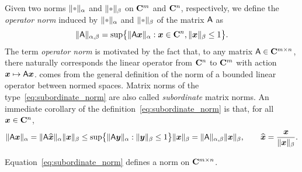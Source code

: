 Given two norms $\norm{\placeholder}_{\alpha}$ and $\norm{\placeholder}_{\beta}$ on $\mathbf C^m$ and $\mathbf C^n$, respectively,
we define the \emph{operator norm} induced by $\norm{\placeholder}_{\alpha}$ and $\norm{\placeholder}_{\beta}$ of the matrix $\mathsf A$ as
\begin{equation}
    \label{eq:subordinate_norm}
    \lVert\mathsf A\rVert_{\alpha,\beta} = \sup \bigl\{ \lVert\mathsf A \mathbf{\boldsymbol{x}}\rVert_{\alpha} : \mathbf{\boldsymbol{x}} \in \mathbf C^n, \lVert\mathbf{\boldsymbol{x}}\rVert_{\beta} \leq 1 \bigr\}.
\end{equation}
The term \emph{operator norm} is motivated by the fact that,
to any matrix $\mathsf A \in \mathbf C^{m \times n}$, there naturally corresponds the linear operator from $\mathbf C^n$ to $\mathbf C^m$ with action~$\mathbf{\boldsymbol{x}} \mapsto \mathsf A \mathbf{\boldsymbol{x}}$.
 comes from the general definition of the norm of a bounded linear operator between normed spaces.
Matrix norms of the type~\eqref{eq:subordinate_norm} are also called \emph{subordinate} matrix norms.
An immediate corollary of the definition~\eqref{eq:subordinate_norm} is that,
for all $\mathbf{\boldsymbol{x}} \in \mathbf C^n$,
\begin{equation}
    \label{eq:submultiplicative_mat_vec}%
    \norm{\mat A \vect x}_{\alpha}
    = \norm{\mat A \widehat{\vect x}}_{\alpha} \norm{\vect x}_{\beta}
    \leq \sup \bigl\{ \norm{\mat A \vect y}_{\alpha}: \norm{\vect y}_{\beta} \leq 1 \bigr\} \norm{\vect x}_{\beta}
    = \norm{\mat A}_{\alpha,\beta} \norm{\vect x}_{\beta},
    \qquad \widehat {\vect x} = \frac{\vect x}{\norm{\vect x}_{\beta}}.
\end{equation}
\begin{proposition}
    Equation~\eqref{eq:subordinate_norm} defines a norm on $\mathbf C^{m \times n}$.
\end{proposition}
